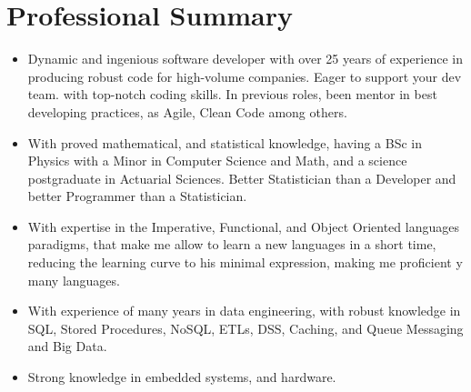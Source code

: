 \section{Professional Summary}

\begin{itemize}
    \item Dynamic and ingenious software developer with over 25 years of experience in producing robust code for
          high-volume companies. Eager to support your dev team. with top-notch coding skills. In previous roles,
          been mentor in best developing practices, as Agile, Clean Code among others.
    \item With proved mathematical, and statistical knowledge, having a BSc in Physics with a Minor in Computer
          Science and Math, and a science postgraduate in Actuarial Sciences. Better Statistician than a Developer
          and better Programmer than a Statistician.
    \item With expertise in the Imperative, Functional, and Object Oriented languages paradigms, that make me
          allow to learn a new languages in a short time, reducing the learning curve to  his minimal expression,
          making me proficient y many languages.
    \item With experience of many years in data engineering, with robust knowledge in  SQL, Stored Procedures,
          NoSQL, ETLs, DSS, Caching, and Queue Messaging and Big Data.
    \item Strong knowledge in embedded systems, and hardware.
\end{itemize}
